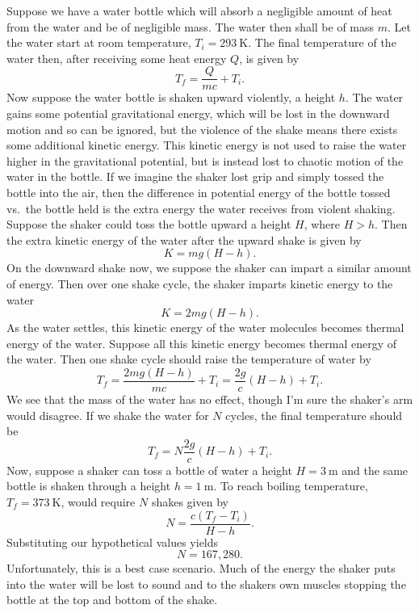 \documentclass[a4paper, 12pt]{config/homework}
\begin{document}
\bigskip\noindent
Suppose we have a water bottle which will absorb a negligible amount of heat from the water and be of negligible mass. The water then shall be of mass \(m\). Let the water start at room temperature, \(T_i=\qty{293}{\kelvin}\). The final temperature of the water then, after receiving some heat energy \(Q\), is given by
\[T_f = \frac{Q}{mc} + T_i.\]
Now suppose the water bottle is shaken upward violently, a height \(h\). The water gains some potential gravitational energy, which will be lost in the downward motion and so can be ignored, but the violence of the shake means there exists some additional kinetic energy. This kinetic energy is not used to raise the water higher in the gravitational potential, but is instead lost to chaotic motion of the water in the bottle. If we imagine the shaker lost grip and simply tossed the bottle into the air, then the difference in potential energy of the bottle tossed vs.\ the bottle held is the extra energy the water receives from violent shaking. Suppose the shaker could toss the bottle upward a height \(H\), where \(H>h\). Then the extra kinetic energy of the water after the upward shake is given by
\[K = mg\left(H-h\right).\]
On the downward shake now, we suppose the shaker can impart a similar amount of energy. Then over one shake cycle, the shaker imparts kinetic energy to the water
\[K = 2mg\left(H-h\right).\]
As the water settles, this kinetic energy of the water molecules becomes thermal energy of the water. Suppose all this kinetic energy becomes thermal energy of the water. Then one shake cycle should raise the temperature of water by
\[T_f = \frac{2mg\left(H-h\right)}{mc} + T_i = \frac{2g}{c}\left(H-h\right) + T_i.\]
We see that the mass of the water has no effect, though I'm sure the shaker's arm would disagree. If we shake the water for \(N\) cycles, the final temperature should be
\[T_f = N\frac{2g}{c}\left(H-h\right) + T_i.\]
Now, suppose a shaker can toss a bottle of water a height \(H=\qty{3}{\meter}\) and the same bottle is shaken through a height \(h=\qty{1}{\meter}\). To reach boiling temperature, \(T_f = \qty{373}{\kelvin}\), would require \(N\) shakes given by
\[N = \frac{c\left(T_f-T_i\right)}{H-h}.\]
Substituting our hypothetical values yields
\[N= 167,280.\]
Unfortunately, this is a best case scenario. Much of the energy the shaker puts into the water will be lost to sound and to the shakers own muscles stopping the bottle at the top and bottom of the shake.
\end{document}
